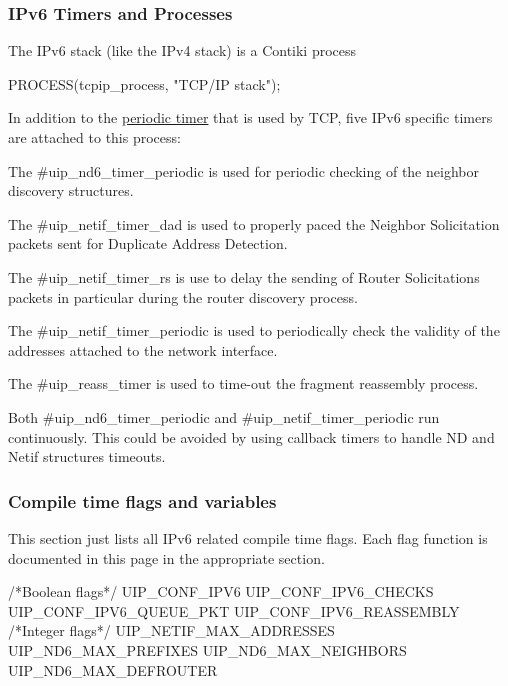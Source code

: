 \hypertarget{a00061_timers}{}\subsubsection{\-I\-Pv6 Timers and Processes}\label{a00061_timers}
\-The \-I\-Pv6 stack (like the \-I\-Pv4 stack) is a \-Contiki process 
\begin{DoxyCode}
PROCESS(tcpip_process, "TCP/IP stack");
\end{DoxyCode}
 \-In addition to the \hyperlink{a00060_mainloop}{periodic timer} that is used by \-T\-C\-P, five \-I\-Pv6 specific timers are attached to this process\-: \begin{DoxyItemize}
\item \-The \#uip\-\_\-nd6\-\_\-timer\-\_\-periodic is used for periodic checking of the neighbor discovery structures. \item \-The \#uip\-\_\-netif\-\_\-timer\-\_\-dad is used to properly paced the \-Neighbor \-Solicitation packets sent for \-Duplicate \-Address \-Detection. \item \-The \#uip\-\_\-netif\-\_\-timer\-\_\-rs is use to delay the sending of \-Router \-Solicitations packets in particular during the router discovery process. \item \-The \#uip\-\_\-netif\-\_\-timer\-\_\-periodic is used to periodically check the validity of the addresses attached to the network interface. \item \-The \#uip\-\_\-reass\-\_\-timer is used to time-\/out the fragment reassembly process. \par
\end{DoxyItemize}
\-Both \#uip\-\_\-nd6\-\_\-timer\-\_\-periodic and \#uip\-\_\-netif\-\_\-timer\-\_\-periodic run continuously. \-This could be avoided by using callback timers to handle \-N\-D and \-Netif structures timeouts.



\hypertarget{a00061_compileflags}{}\subsubsection{\-Compile time flags and variables}\label{a00061_compileflags}
\-This section just lists all \-I\-Pv6 related compile time flags. \-Each flag function is documented in this page in the appropriate section. 
\begin{DoxyCode}
/*Boolean flags*/
UIP_CONF_IPV6        
UIP_CONF_IPV6_CHECKS
UIP_CONF_IPV6_QUEUE_PKT 
UIP_CONF_IPV6_REASSEMBLY        
/*Integer flags*/
UIP_NETIF_MAX_ADDRESSES 
UIP_ND6_MAX_PREFIXES   
UIP_ND6_MAX_NEIGHBORS   
UIP_ND6_MAX_DEFROUTER  
\end{DoxyCode}




